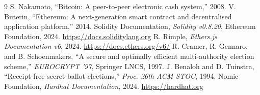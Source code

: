 \documentclass[11pt]{article}
\begin{document}
\begin{thebibliography}{9}
 S. Nakamoto, ``Bitcoin: A peer-to-peer electronic cash system,'' 2008.
 V. Buterin, ``Ethereum: A next-generation smart contract and decentralised application platform,'' 2014.
 Solidity Documentation, \emph{Solidity v0.8.20}, Ethereum Foundation, 2024. \url{https://docs.soliditylang.org}
 R. Rimple, \emph{Ethers.js Documentation v6}, 2024. \url{https://docs.ethers.org/v6/}
 R. Cramer, R. Gennaro, and B. Schoenmakers, ``A secure and optimally efficient multi-authority election scheme,'' \emph{EUROCRYPT '97}, Springer LNCS, 1997.
 J. Benaloh and D. Tuinstra, ``Receipt-free secret-ballot elections,'' \emph{Proc. 26th ACM STOC}, 1994.
 Nomic Foundation, \emph{Hardhat Documentation}, 2024. \url{https://hardhat.org}
\end{thebibliography}
\end{document}
